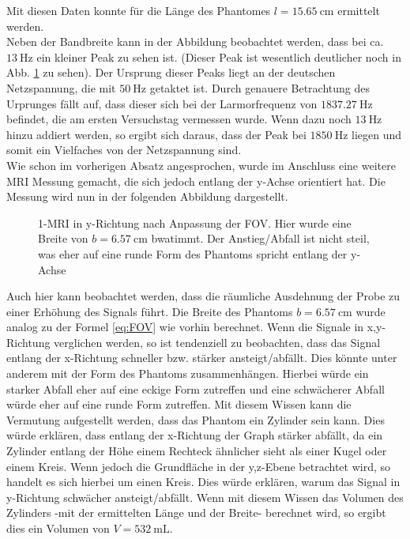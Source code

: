 Mit diesen Daten konnte für die Länge des Phantomes $l=\SI{15,65}{\centi\m}$ ermittelt werden.\\
Neben der Bandbreite kann in der Abbildung beobachtet werden, dass bei ca. $\SI{13}{\hertz}$ ein kleiner Peak zu sehen ist. (Dieser Peak ist wesentlich deutlicher noch in Abb. \ref{fig:1Dy} zu sehen). Der Ursprung dieser Peaks liegt an der deutschen Netzspannung, die mit $\SI{50}{\hertz}$ getaktet ist. Durch genauere Betrachtung des Urprunges fällt auf, dass dieser sich bei der Larmorfrequenz von $\SI{1837,27}{\hertz}$ befindet, die am ersten Versuchstag vermessen wurde. Wenn dazu noch $\SI{13}{\hertz}$ hinzu addiert werden, so  ergibt sich daraus, dass der Peak bei $\SI{1850}{\hertz}$ liegen und somit ein Vielfaches von der Netzspannung sind.\\
Wie schon im vorherigen Absatz angesprochen, wurde im Anschluss eine weitere MRI Messung gemacht, die sich jedoch entlang der y-Achse orientiert hat. Die Messung wird nun in der folgenden Abbildung dargestellt.
\begin{figure}[H]
    \centering
    
    \caption[1-MRI in y-Richtung nach Anpassung der FOV]{1-MRI in y-Richtung nach Anpassung der FOV. Hier wurde eine Breite von $b=\SI{6,57}{\centi \m}$ bwatimmt. Der Anstieg/Abfall ist nicht steil, was eher auf eine runde Form des Phantoms spricht entlang der y-Achse}\label{fig:1Dy}
\end{figure} 
Auch hier kann beobachtet werden, dass die räumliche Ausdehnung der Probe zu einer Erhöhung des Signals führt. Die Breite des Phantoms $b=\SI{6,57}{\centi \m}$ wurde analog zu der Formel \ref{eq:FOV} wie vorhin berechnet. Wenn die Signale in x,y-Richtung verglichen werden, so ist tendenziell zu beobachten, dass das Signal entlang der x-Richtung schneller bzw. stärker ansteigt/abfällt. Dies könnte unter anderem mit der Form des Phantoms zusammenhängen. Hierbei würde ein starker Abfall eher auf eine eckige Form zutreffen und eine schwächerer Abfall würde eher auf eine runde Form zutreffen. Mit diesem Wissen kann die Vermutung aufgestellt werden, dass das Phantom ein Zylinder sein kann. Dies würde erklären, dass entlang der x-Richtung der Graph stärker abfällt, da ein Zylinder entlang der Höhe einem Rechteck ähnlicher sieht als einer Kugel oder einem Kreis. Wenn jedoch die Grundfläche in der y,z-Ebene betrachtet wird, so handelt es sich hierbei um einen Kreis. Dies würde erklären, warum das Signal in y-Richtung schwächer ansteigt/abfällt. Wenn mit diesem Wissen das Volumen des Zylinders -mit der ermittelten Länge und der Breite- berechnet wird, so ergibt dies ein Volumen von $V=\SI{532}{\milli\liter}$.\\

